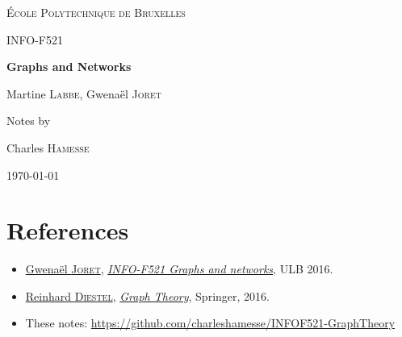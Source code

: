 \documentclass[11pt]{book}
\begin{document}
\begin{titlepage}
	\centering
	\vspace{1cm}
	{\scshape\LARGE École Polytechnique de Bruxelles \par}
	\vspace{3.5cm}
	{\scshape\Large INFO-F521\par}
	\vspace{.5cm}
	{\huge\bfseries Graphs and Networks\par}
	\vspace{2cm}
	{\Large Martine \textsc{Labbe}, Gwenaël \textsc{Joret}\par}
	\vfill
	Notes by \par
	Charles \textsc{Hamesse}

	\vfill

	{\large \today\par}
\end{titlepage}
\tableofcontents









\chapter*{References}
%

\begin{itemize}
\item
  \href{http://www.ulb.ac.be/di/algo/gjoret/}{Gwenaël \textsc{Joret}},
  \href{http://banssbfr.ulb.ac.be/PROD_frFR/bzscrse.p_disp_course_detail?cat_term_in=201617&subj_code_in=INFO&crse_numb_in=F521&PPAGE=ESC_PROGCAT_AREREQ&PPROGCODE=MA-INFO&PAREA=M-INFOS&PARETERM=201617&PTERM=201617}{\textit{INFO-F521 Graphs and networks}},
  ULB 2016.

\item
  \href{http://www.math.uni-hamburg.de/home/diestel/index.html}{Reinhard \textsc{Diestel}},
  \href{http://diestel-graph-theory.com/index.html}{\textit{Graph Theory}},
  Springer,
   2016.

\item
  These notes:
  \href{https://github.com/charleshamesse/INFOF521-GraphTheory}{https://github.com/charleshamesse/INFOF521-GraphTheory}
\end{itemize}
\end{document}
